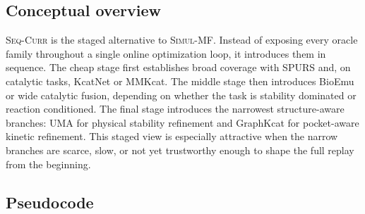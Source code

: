 \documentclass[11pt]{article}
\newcommand{\methodI}{\textsc{Simul-MF}}
\newcommand{\methodII}{\textsc{Seq-Curr}}
\begin{document}
	\subsection{Conceptual overview}
	
	\methodII{} is the staged alternative to \methodI{}. Instead of exposing every oracle family throughout a single online optimization loop, it introduces them in sequence. The cheap stage first establishes broad coverage with SPURS and, on catalytic tasks, KcatNet or MMKcat. The middle stage then introduces BioEmu or wide catalytic fusion, depending on whether the task is stability dominated or reaction conditioned. The final stage introduces the narrowest structure-aware branches: UMA for physical stability refinement and GraphKcat for pocket-aware kinetic refinement. This staged view is especially attractive when the narrow branches are scarce, slow, or not yet trustworthy enough to shape the full replay from the beginning.
	
	\subsection{Pseudocode}
	
\end{document}
